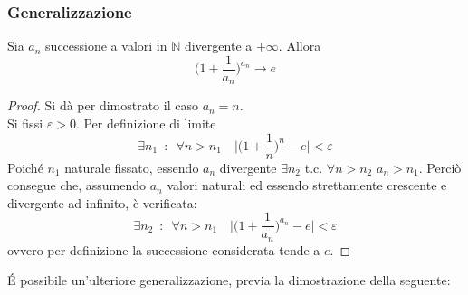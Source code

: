\documentclass[10pt, oneside]{book}
\theoremstyle{plain}
\begin{document}
\subsubsection*{Generalizzazione}
\begin{prop}
    Sia $a_n$ successione a valori in $\mathbb{N}$ divergente a $+\infty$. Allora
    \[\bigg(1 + \frac{1}{a_n}\bigg)^{a_n} \longrightarrow e\]
\end{prop}
\begin{proof}
    Si dà per dimostrato il caso $a_n = n$.
    \\Si fissi $\varepsilon > 0$. Per definizione di limite \[\exists n_1 \enspace : \enspace \forall n > n_1 \quad \bigg| \bigg(1 + \frac{1}{n}\bigg)^n - e\bigg| < \varepsilon\]
    Poiché $n_1$ naturale fissato, essendo $a_n$ divergente $\exists n_2$ t.c. $\forall n > n_2$ $a_n > n_1$. Perciò consegue che, assumendo $a_n$ valori naturali ed essendo strettamente crescente e divergente ad infinito, è verificata:
    \[\exists n_2 \enspace : \enspace \forall n > n_1 \quad \bigg| \bigg(1 + \frac{1}{a_n}\bigg)^{a_n} - e\bigg| < \varepsilon\]
    ovvero per definizione la successione considerata tende a $e$.
\end{proof}

\'E possibile un'ulteriore generalizzazione, previa la dimostrazione della seguente:
\end{document}
